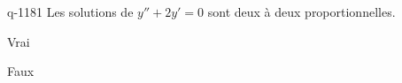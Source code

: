 \begin{truefalse}{q-1181}
Les solutions de $y''+2y'=0$ sont deux à deux proportionnelles.
\item Vrai
\item* Faux
\end{truefalse}

